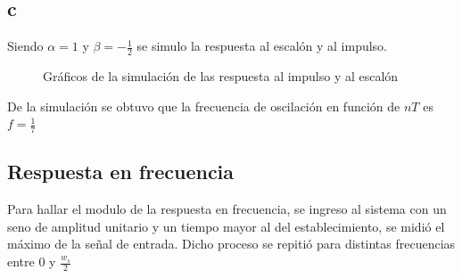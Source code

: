 \documentclass[../../guia1.tex]{subfiles}
\begin{document}
\subsection{c}
Siendo $\alpha = 1$ y $\beta = -\frac{1}{2}$ se simulo la respuesta al escalón y al impulso.
\begin{figure}[H]
 \centering

 \caption{Gráficos de la simulación de las respuesta al impulso y al escalón}
 \label{f:ejc}
\end{figure}
De la simulación se obtuvo que la frecuencia de oscilación en función de $nT$ es $f= \frac{1}{7}$
\subsection{Respuesta en frecuencia}
Para hallar el modulo de la respuesta en frecuencia, se ingreso al sistema con un seno de amplitud unitario y un tiempo mayor al del establecimiento, se midió el máximo de la se\~nal de entrada. Dicho proceso se repitió para distintas frecuencias entre 0 y $\frac{w_s}{2} $
\end{document}
